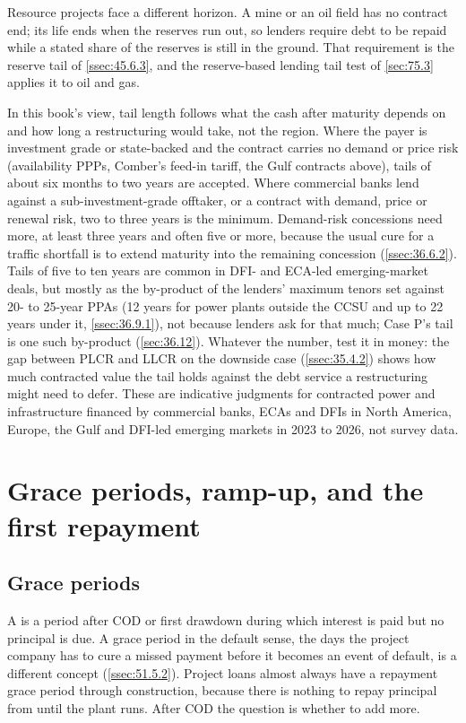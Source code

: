 Resource projects face a different horizon. A mine or an oil field has no contract end; its life ends when the reserves run out, so lenders require debt to be repaid while a stated share of the reserves is still in the ground. That requirement is the reserve tail of \cref{ssec:45.6.3}, and the reserve-based lending tail test of \cref{sec:75.3} applies it to oil and gas.

In this book's view, tail length follows what the cash after maturity depends on and how long a restructuring would take, not the region. Where the payer is investment grade or state-backed and the contract carries no demand or price risk (availability PPPs, Comber's feed-in tariff, the Gulf contracts above), tails of about six months to two years are accepted. Where commercial banks lend against a sub-investment-grade offtaker, or a contract with demand, price or renewal risk, two to three years is the minimum. Demand-risk concessions need more, at least three years and often five or more, because the usual cure for a traffic shortfall is to extend maturity into the remaining concession (\cref{ssec:36.6.2}). Tails of five to ten years are common in DFI- and ECA-led emerging-market deals, but mostly as the by-product of the lenders' maximum tenors set against 20- to 25-year PPAs (12 years for power plants outside the CCSU and up to 22 years under it, \cref{ssec:36.9.1}), not because lenders ask for that much; Case P's tail is one such by-product (\cref{sec:36.12}). Whatever the number, test it in money: the gap between PLCR and LLCR on the downside case (\cref{ssec:35.4.2}) shows how much contracted value the tail holds against the debt service a restructuring might need to defer. These are indicative judgments for contracted power and infrastructure financed by commercial banks, ECAs and DFIs in North America, Europe, the Gulf and DFI-led emerging markets in 2023 to 2026, not survey data.

\section{Grace periods, ramp-up, and the first repayment}\label{sec:36.6}

\subsection{Grace periods}\label{ssec:36.6.1}

A  is a period after COD or first drawdown during which interest is paid but no principal is due. A grace period in the default sense, the days the project company has to cure a missed payment before it becomes an event of default, is a different concept (\cref{ssec:51.5.2}). Project loans almost always have a repayment grace period through construction, because there is nothing to repay principal from until the plant runs. After COD the question is whether to add more.


